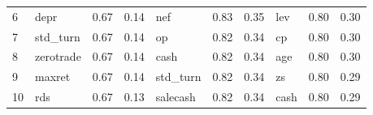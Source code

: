 \documentclass[12pt]{article}
\begin{document}
\begin{landscape}
\begin{footnotesize}
\begin{longtable}{l|lcc|lcc|lcc}
			6                     & depr                        & 0.67                                                                                 & 0.14                            & nef                         & 0.83                                                                                 & 0.35                            & lev                         & 0.80                                                                                 & 0.30                           \\
			7                     & std\_turn                   & 0.67                                                                                 & 0.14                            & op                          & 0.82                                                                                 & 0.34                            & cp                          & 0.80                                                                                 & 0.30                           \\
			8                     & zerotrade                   & 0.67                                                                                 & 0.14                            & cash                        & 0.82                                                                                 & 0.34                            & age                         & 0.80                                                                                 & 0.30                           \\
			9                     & maxret                      & 0.67                                                                                 & 0.14                            & std\_turn                   & 0.82                                                                                 & 0.34                            & zs                          & 0.80                                                                                 & 0.29                           \\
			10                    & rds                         & 0.67                                                                                 & 0.13                            & salecash                    & 0.82                                                                                 & 0.34                            & cash                        & 0.80                                                                                 & 0.29                           \\

\end{longtable}
\end{footnotesize}
\end{landscape}
\end{document}

